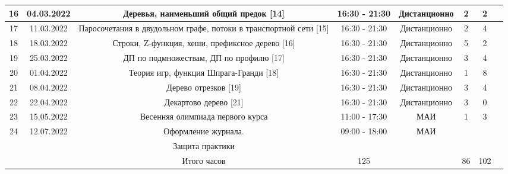 {\begin{tabular}{|c|c|c|c|c|c|c|c|}
\hline
16 & 04.03.2022 & Деревья, наименьший общий предок [14] & 16:30 - 21:30 & Дистанционно & 2 & 2 & \\
\hline
17 & 11.03.2022 & Паросочетания в двудольном графе, потоки в транспортной сети [15] & 16:30 - 21:30 & Дистанционно & 2 & 4 & \\
\hline
18 & 18.03.2022 & Строки, Z-функция, хеши, префиксное дерево [16] & 16:30 - 21:30 & Дистанционно & 5 & 2 & \\
\hline
19 & 25.03.2022 & ДП по подмножествам, ДП по профилю [17] & 16:30 - 21:30 & Дистанционно & 3 & 4 & \\
\hline
20 & 01.04.2022 & Теория игр, функция Шпрага-Гранди [18] & 16:30 - 21:30 & Дистанционно & 1 & 8 & \\
\hline
21 & 08.04.2022 & Дерево отрезков [19] & 16:30 - 21:30 & Дистанционно & 3 & 4 & \\
\hline
22 & 22.04.2022 & Декартово дерево [21] & 16:30 - 21:30 & Дистанционно & 3 & 0 & \\
\hline
23 & 15.05.2022 & Весенняя олимпиада первого курса & 11:00 - 17:30 & МАИ & 1 & 3 & \\
\hline
24 & 12.07.2022 & Оформление журнала. & 09:00 - 18:00 & МАИ & & & \\
& & Защита практики & & & & & \\
\hline
& & Итого часов & 125 & & 86 & 102 & \\
\hline
\end{tabular}
}

\pagebreak
